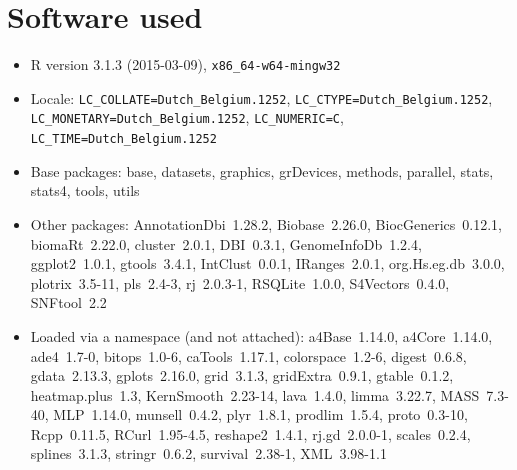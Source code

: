 \documentclass[a4paper]{article}
\begin{document}
\section{Software used}
\begin{itemize}\raggedright
  \item R version 3.1.3 (2015-03-09), \verb|x86_64-w64-mingw32|
  \item Locale: \verb|LC_COLLATE=Dutch_Belgium.1252|, \verb|LC_CTYPE=Dutch_Belgium.1252|, \verb|LC_MONETARY=Dutch_Belgium.1252|, \verb|LC_NUMERIC=C|, \verb|LC_TIME=Dutch_Belgium.1252|
  \item Base packages: base, datasets,
    graphics, grDevices, methods, parallel,
    stats, stats4, tools, utils
  \item Other packages:
    AnnotationDbi~1.28.2, Biobase~2.26.0,
    BiocGenerics~0.12.1, biomaRt~2.22.0,
    cluster~2.0.1, DBI~0.3.1,
    GenomeInfoDb~1.2.4, ggplot2~1.0.1,
    gtools~3.4.1, IntClust~0.0.1,
    IRanges~2.0.1, org.Hs.eg.db~3.0.0,
    plotrix~3.5-11, pls~2.4-3, rj~2.0.3-1,
    RSQLite~1.0.0, S4Vectors~0.4.0,
    SNFtool~2.2
  \item Loaded via a namespace (and not
    attached): a4Base~1.14.0, a4Core~1.14.0,
    ade4~1.7-0, bitops~1.0-6,
    caTools~1.17.1, colorspace~1.2-6,
    digest~0.6.8, gdata~2.13.3,
    gplots~2.16.0, grid~3.1.3,
    gridExtra~0.9.1, gtable~0.1.2,
    heatmap.plus~1.3, KernSmooth~2.23-14,
    lava~1.4.0, limma~3.22.7, MASS~7.3-40,
    MLP~1.14.0, munsell~0.4.2, plyr~1.8.1,
    prodlim~1.5.4, proto~0.3-10,
    Rcpp~0.11.5, RCurl~1.95-4.5,
    reshape2~1.4.1, rj.gd~2.0.0-1,
    scales~0.2.4, splines~3.1.3,
    stringr~0.6.2, survival~2.38-1,
    XML~3.98-1.1
\end{itemize}
\end{document}
